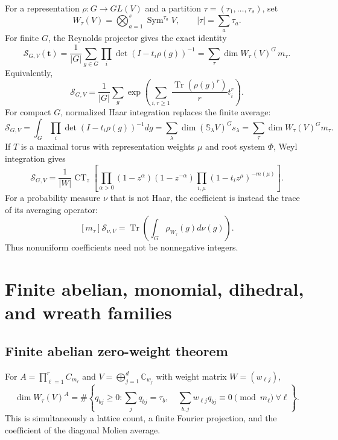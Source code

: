 \documentclass[10pt]{article}
\newcommand{\Sym}{\operatorname{Sym}}
\newcommand{\Tr}{\operatorname{Tr}}
\newcommand{\CT}{\operatorname{CT}}
\newcommand{\MGF}{\mathcal S}
\newcommand{\C}{\mathbb C}
\begin{document}
For a representation $\rho:G\to GL(V)$ and a partition
$\tau=(\tau_1,\ldots,\tau_s)$, set
\[
 W_\tau(V)=\bigotimes_{a=1}^s\Sym^{\tau_a}V,
 \qquad |\tau|=\sum_a\tau_a.
\]
For finite $G$, the Reynolds projector gives the exact identity
\begin{equation}\label{eq:finite-master}
\boxed{\MGF_{G,V}(\mathbf t)=\frac1{|G|}\sum_{g\in G}
 \prod_i\det(I-t_i\rho(g))^{-1}
 =\sum_\tau\dim W_\tau(V)^G\,m_\tau.}
\end{equation}
Equivalently,
\[
 \MGF_{G,V}=\frac1{|G|}\sum_g
 \exp\!\left(\sum_{i,r\ge1}\frac{\Tr(\rho(g)^r)}r t_i^r\right).
\]
For compact $G$, normalized Haar integration replaces the finite average:
\begin{equation}\label{eq:compact-master}
\boxed{\MGF_{G,V}=\int_G\prod_i\det(I-t_i\rho(g))^{-1}dg
 =\sum_\lambda\dim(\mathbb S_\lambda V)^G s_\lambda
 =\sum_\tau\dim W_\tau(V)^Gm_\tau.}
\end{equation}
If $T$ is a maximal torus with representation weights $\mu$ and root system
$\Phi$, Weyl integration gives
\begin{equation}\label{eq:weyl}
\MGF_{G,V}=\frac1{|W|}\CT_z\left[
 \prod_{\alpha>0}(1-z^\alpha)(1-z^{-\alpha})
 \prod_{i,\mu}(1-t_i z^\mu)^{-m(\mu)}\right].
\end{equation}
For a probability measure $\nu$ that is not Haar, the coefficient is instead
the trace of its averaging operator:
\begin{equation}\label{eq:nonuniform}
[m_\tau]\MGF_{\nu,V}
=\Tr\!\left(\int_G\rho_{W_\tau}(g)d\nu(g)\right).
\end{equation}
Thus nonuniform coefficients need not be nonnegative integers.

\section{Finite abelian, monomial, dihedral, and wreath families}

\subsection{Finite abelian zero-weight theorem}
For $A=\prod_{\ell=1}^r C_{m_\ell}$ and
$V=\bigoplus_{j=1}^d\C_{w_j}$ with weight matrix $W=(w_{\ell j})$,
\begin{equation}\label{eq:abelian}
\boxed{\dim W_\tau(V)^A=\#\left\{q_{bj}\ge0:
 \sum_jq_{bj}=\tau_b,\quad
 \sum_{b,j}w_{\ell j}q_{bj}\equiv0\pmod{m_\ell}\ \forall\ell\right\}.}
\end{equation}
This is simultaneously a lattice count, a finite Fourier projection, and the
coefficient of the diagonal Molien average.
\end{document}
